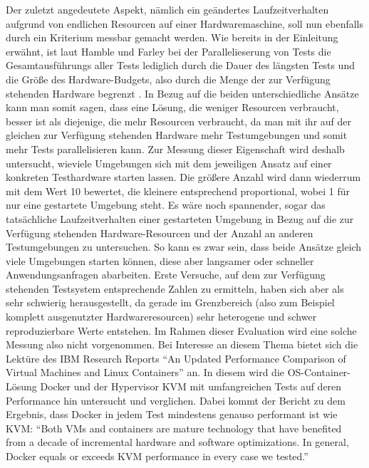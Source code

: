 Der zuletzt angedeutete Aspekt, nämlich ein geändertes Laufzeitverhalten aufgrund von endlichen Resourcen auf einer Hardwaremaschine, soll nun ebenfalls durch ein Kriterium messbar gemacht werden. Wie bereits in der Einleitung erwähnt, ist laut Hamble und Farley bei der Parallelieserung von Tests die Gesamtausführungs aller Tests lediglich durch die Dauer des längsten Tests und die Größe des Hardware-Budgets, also durch die Menge der zur Verfügung stehenden Hardware begrenzt \citep[Vgl.][S. 310]{HumFar10}. In Bezug auf die beiden unterschiedliche Ansätze kann man somit sagen, dass eine Lösung, die weniger Resourcen verbraucht, besser ist als diejenige, die mehr Resourcen verbraucht, da man mit ihr auf der gleichen zur Verfügung stehenden Hardware mehr Testumgebungen und somit mehr Tests parallelisieren kann. Zur Messung dieser Eigenschaft wird deshalb untersucht, wieviele Umgebungen sich mit dem jeweiligen Ansatz auf einer konkreten Testhardware starten lassen. Die größere Anzahl wird dann wiederrum mit dem Wert 10 bewertet, die kleinere entsprechend proportional, wobei 1 für nur eine gestartete Umgebung steht. Es wäre noch spannender, sogar das tatsächliche Laufzeitverhalten einer gestarteten Umgebung in Bezug auf die zur Verfügung stehenden Hardware-Resourcen und der Anzahl an anderen Testumgebungen zu untersuchen. So kann es zwar sein, dass beide Ansätze gleich viele Umgebungen starten können, diese aber langsamer oder schneller Anwendungsanfragen abarbeiten. Erste Versuche, auf dem zur Verfügung stehenden Testsystem entsprechende Zahlen zu ermitteln, haben sich aber als sehr schwierig herausgestellt, da gerade im Grenzbereich (also zum Beispiel komplett ausgenutzter Hardwareresourcen) sehr heterogene und schwer reproduzierbare Werte entstehen. Im Rahmen dieser Evaluation wird eine solche Messung also nicht vorgenommen. Bei Interesse an diesem Thema bietet sich die Lektüre des IBM Research Reports "`An Updated Performance Comparison of Virtual Machines and Linux Containers"' an. In diesem wird die OS-Container-Lösung Docker und der Hypervisor KVM mit umfangreichen Tests auf deren Performance hin untersucht und verglichen. Dabei kommt der Bericht zu dem Ergebnis, dass Docker in jedem Test mindestens genauso performant ist wie KVM: "`Both VMs and containers are mature technology that have benefited from a decade of incremental hardware and software optimizations. In general, Docker equals or exceeds KVM performance in every case we tested."' \citep[S.][Conclusion]{comparison}

